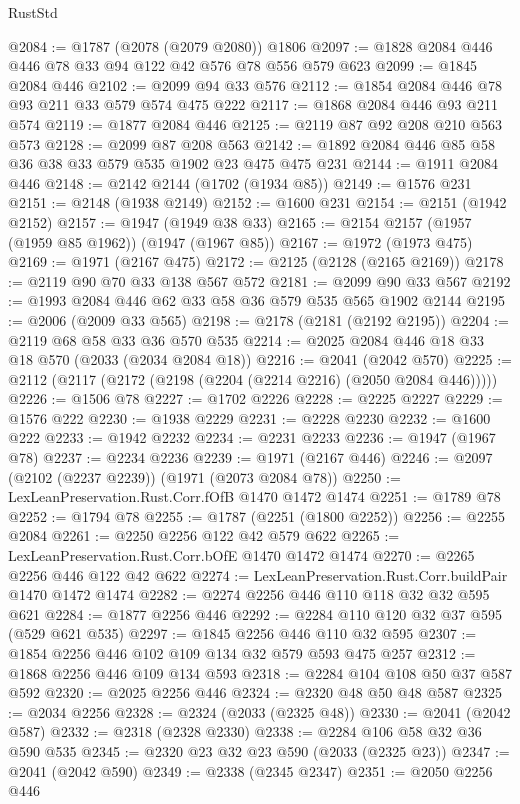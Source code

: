 \begin{lexlean}{RustStd}
\begin{coremodule}
@2084 := @1787 (@2078 (@2079 @2080)) @1806
@2097 := @1828 @2084 @446 @446 @78 @33 @94 @122 @42 @576 @78 @556 @579 @623
@2099 := @1845 @2084 @446
@2102 := @2099 @94 @33 @576
@2112 := @1854 @2084 @446 @78 @93 @211 @33 @579 @574 @475 @222
@2117 := @1868 @2084 @446 @93 @211 @574
@2119 := @1877 @2084 @446
@2125 := @2119 @87 @92 @208 @210 @563 @573
@2128 := @2099 @87 @208 @563
@2142 := @1892 @2084 @446 @85 @58 @36 @38 @33 @579 @535 @1902 @23 @475 @475 @231
@2144 := @1911 @2084 @446
@2148 := @2142 @2144 (@1702 (@1934 @85))
@2149 := @1576 @231
@2151 := @2148 (@1938 @2149)
@2152 := @1600 @231
@2154 := @2151 (@1942 @2152)
@2157 := @1947 (@1949 @38 @33)
@2165 := @2154 @2157 (@1957 (@1959 @85 @1962)) (@1947 (@1967 @85))
@2167 := @1972 (@1973 @475)
@2169 := @1971 (@2167 @475)
@2172 := @2125 (@2128 (@2165 @2169))
@2178 := @2119 @90 @70 @33 @138 @567 @572
@2181 := @2099 @90 @33 @567
@2192 := @1993 @2084 @446 @62 @33 @58 @36 @579 @535 @565 @1902 @2144
@2195 := @2006 (@2009 @33 @565)
@2198 := @2178 (@2181 (@2192 @2195))
@2204 := @2119 @68 @58 @33 @36 @570 @535
@2214 := @2025 @2084 @446 @18 @33 @18 @570 (@2033 (@2034 @2084 @18))
@2216 := @2041 (@2042 @570)
@2225 := @2112 (@2117 (@2172 (@2198 (@2204 (@2214 @2216) (@2050 @2084 @446)))))
@2226 := @1506 @78
@2227 := @1702 @2226
@2228 := @2225 @2227
@2229 := @1576 @222
@2230 := @1938 @2229
@2231 := @2228 @2230
@2232 := @1600 @222
@2233 := @1942 @2232
@2234 := @2231 @2233
@2236 := @1947 (@1967 @78)
@2237 := @2234 @2236
@2239 := @1971 (@2167 @446)
@2246 := @2097 (@2102 (@2237 @2239)) (@1971 (@2073 @2084 @78))
@2250 := LexLeanPreservation.Rust.Corr.fOfB @1470 @1472 @1474
@2251 := @1789 @78
@2252 := @1794 @78
@2255 := @1787 (@2251 (@1800 @2252))
@2256 := @2255 @2084
@2261 := @2250 @2256 @122 @42 @579 @622
@2265 := LexLeanPreservation.Rust.Corr.bOfE @1470 @1472 @1474
@2270 := @2265 @2256 @446 @122 @42 @622
@2274 := LexLeanPreservation.Rust.Corr.buildPair @1470 @1472 @1474
@2282 := @2274 @2256 @446 @110 @118 @32 @32 @595 @621
@2284 := @1877 @2256 @446
@2292 := @2284 @110 @120 @32 @37 @595 (@529 @621 @535)
@2297 := @1845 @2256 @446 @110 @32 @595
@2307 := @1854 @2256 @446 @102 @109 @134 @32 @579 @593 @475 @257
@2312 := @1868 @2256 @446 @109 @134 @593
@2318 := @2284 @104 @108 @50 @37 @587 @592
@2320 := @2025 @2256 @446
@2324 := @2320 @48 @50 @48 @587
@2325 := @2034 @2256
@2328 := @2324 (@2033 (@2325 @48))
@2330 := @2041 (@2042 @587)
@2332 := @2318 (@2328 @2330)
@2338 := @2284 @106 @58 @32 @36 @590 @535
@2345 := @2320 @23 @32 @23 @590 (@2033 (@2325 @23))
@2347 := @2041 (@2042 @590)
@2349 := @2338 (@2345 @2347)
@2351 := @2050 @2256 @446

\end{coremodule}
\end{lexlean}
